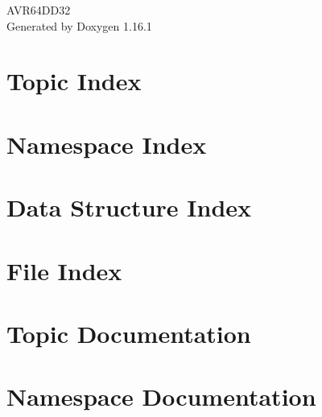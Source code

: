 \documentclass[twoside]{book}
\newcommand{\+}{\discretionary{\mbox{\scriptsize$\hookleftarrow$}}{}{}}
\newcommand{\clearemptydoublepage}{%
    \newpage{\pagestyle{empty}\cleardoublepage}%
  }
\begin{document}
  \raggedbottom
    \hypersetup{pageanchor=false,
                bookmarksnumbered=true,
                pdfencoding=unicode
               }
  \begin{titlepage}
  \vspace*{7cm}
  \begin{center}%
  {\Large AVR64\+DD32}\\
  \vspace*{1cm}
  {\large Generated by Doxygen 1.16.1}\\
  \end{center}
  \end{titlepage}
  \clearemptydoublepage
  \tableofcontents
  \clearemptydoublepage
  \hypersetup{pageanchor=true}



\chapter{Topic Index}

\chapter{Namespace Index}

\chapter{Data Structure Index}

\chapter{File Index}

\chapter{Topic Documentation}




\chapter{Namespace Documentation}

\end{document}
